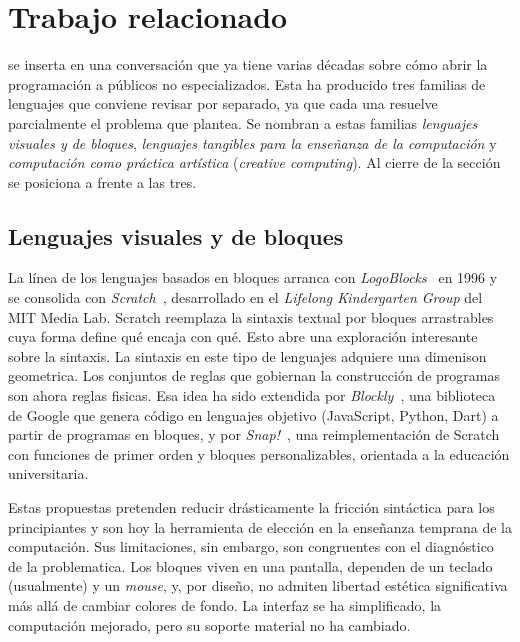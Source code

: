 
\section{Trabajo relacionado}
\label{sec:related}

\sculpt se inserta en una conversaci\'on que ya tiene varias d\'ecadas
sobre c\'omo abrir la programaci\'on a p\'ublicos no especializados.
Esta ha producido tres familias de lenguajes que conviene
revisar por separado, ya que cada una resuelve parcialmente el
problema que \sculpt plantea. Se nombran a estas familias
\emph{lenguajes visuales y de bloques}, \emph{lenguajes tangibles para
la ense\~nanza de la computaci\'on} y \emph{computaci\'on como pr\'actica
art\'istica} (\emph{creative computing}). Al cierre de la secci\'on
se posiciona a \sculpt frente a las tres.

\subsection{Lenguajes visuales y de bloques}
\label{sec:related:visual}

La l\'inea de los lenguajes basados en bloques arranca con
\emph{LogoBlocks}~\cite{begel96logoblocks} en 1996 y se consolida con
\emph{Scratch}~\cite{resnick+09scratch}, desarrollado en el
\emph{Lifelong Kindergarten Group} del MIT Media Lab. Scratch reemplaza
la sintaxis textual por bloques arrastrables cuya forma define qu\'e
encaja con qu\'e. Esto abre una exploración interesante sobre la sintaxis.
La sintaxis en este tipo de lenguajes adquiere una dimenison geometrica.
Los conjuntos de reglas que gobiernan la construcci\'on de programas son 
ahora reglas fisicas. Esa idea ha sido extendida por \emph{Blockly}~\cite{fraser15blockly},
una biblioteca de Google que genera c\'odigo en lenguajes objetivo
(JavaScript, Python, Dart) a partir de programas en bloques, y por
\emph{Snap!}~\cite{harvey13snap}, una reimplementaci\'on de Scratch
con funciones de primer orden y bloques personalizables, orientada a la
educaci\'on universitaria.

Estas propuestas pretenden reducir dr\'asticamente la fricci\'on sint\'actica
para los principiantes y son hoy la herramienta de elecci\'on en la
ense\~nanza temprana de la computaci\'on. Sus limitaciones, sin embargo,
son congruentes con el diagn\'ostico de la problematica. Los
bloques viven en una pantalla, dependen de un teclado (usualmente) y un \emph{mouse},
y, por dise\~no, no admiten libertad est\'etica significativa
m\'as all\'a de cambiar colores de fondo. La interfaz se ha simplificado, la computación mejorado,
pero su soporte material no ha cambiado.

